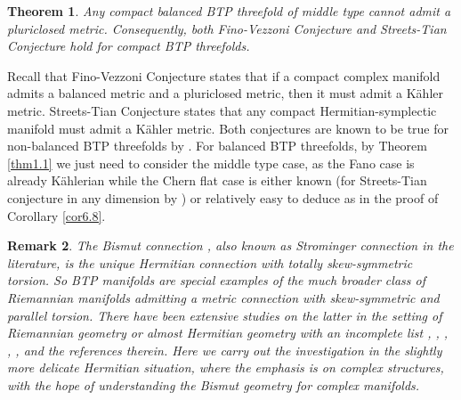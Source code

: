 \documentclass{amsart}
\numberwithin{equation}{section}
\newtheorem{theorem} {Theorem} [section]
\newtheorem{remark}  [theorem]     {Remark}
\theoremstyle{definition}
\renewcommand{\1}{\mathds{1}}
\renewcommand{\>}{\rightarrow}
\begin{document}
\begin{theorem} \label{thm1.2}
Any compact balanced BTP threefold of middle type cannot admit a pluriclosed metric. Consequently, both Fino-Vezzoni Conjecture and Streets-Tian Conjecture hold for compact BTP threefolds.
\end{theorem}

Recall that Fino-Vezzoni Conjecture states that if a compact complex manifold admits a balanced metric and a pluriclosed metric, then it must admit a K\"ahler metric. Streets-Tian Conjecture states that any compact Hermitian-symplectic manifold must admit a K\"ahler metric. Both conjectures are known to be true for non-balanced BTP threefolds by  \cite[Corollary 1.19]{ZhaoZ24}. For balanced BTP threefolds, by Theorem \ref{thm1.1} we just need to consider the middle type case, as the Fano case is already K\"ahlerian while the Chern flat case is either known (for Streets-Tian conjecture in any dimension by \cite{DLV}) or relatively easy to deduce as in the proof of Corollary \ref{cor6.8}.

\begin{remark}
The Bismut connection \cite{Bismut}, also known as Strominger connection \cite{Strominger} in the literature, is the unique Hermitian connection with totally skew-symmetric torsion. So BTP manifolds are special examples of the much broader class of Riemannian manifolds admitting a metric connection with skew-symmetric and parallel torsion. There have been extensive studies on the latter in the setting of Riemannian geometry or almost Hermitian geometry %
with an incomplete list \cite{AF04}, \cite{AF14}, \cite{AFF}, \cite{AFS}, \cite{AFK}, \cite{CMS} \cite{Sch} and the references therein. Here we carry out the investigation in the slightly more delicate Hermitian situation, where the emphasis is on complex structures, with the hope of understanding the Bismut geometry for complex manifolds.
\end{remark}
\end{document}
